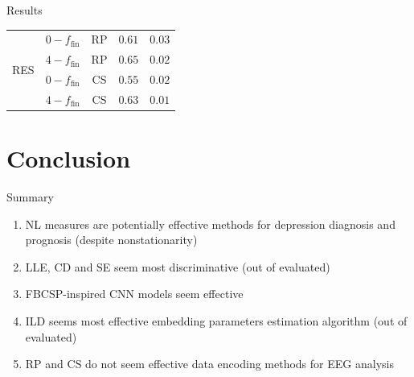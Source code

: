 \documentclass{beamer}
\begin{document}
\begin{frame}{Results}
\begin{table}[tbp]
{\begin{tabular}{|c|c|c|c|c|}
\multirow{4}{*}{RES} & $0-f_{\text{fin}}$ & RP &   $0.61$ & $0.03$ \\ \cline{2-5}               
                     & $4-f_{\text{fin}}$ & RP &       $\mathbf{0.65}$ & $0.02$    \\ \cline{2-5}   
                     & $0-f_{\text{fin}}$ & CS &      $0.55$ & $0.02$ \\ \cline{2-5}               
                     & $4-f_{\text{fin}}$ & CS &      $0.63$ & $0.01$ \\ \hline               
\end{tabular}
}
\end{table}
\end{frame}


\section{Conclusion}


\begin{frame}{Summary}
    \centering
    \begin{enumerate}
        \item<1-> NL measures are potentially effective methods for depression diagnosis and prognosis {\scriptsize(despite nonstationarity)}
        \item<2-> LLE, CD and SE seem most discriminative {\scriptsize (out of evaluated)}
        \item<3-> FBCSP-inspired CNN models seem effective
        \item<4-> {\scriptsize ILD seems most effective embedding parameters estimation algorithm {\scriptsize(out of evaluated)}}
        \item<4-> {\scriptsize RP and CS do not seem effective data encoding methods for EEG analysis}
    \end{enumerate}
    
\end{frame}

\end{document}
